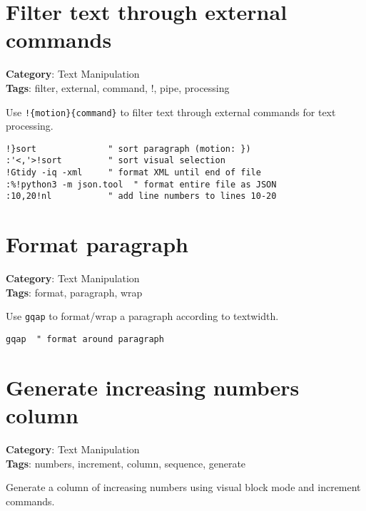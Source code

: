 {{{{{{{{{{{{{\section{Filter text through external commands}

\textbf{Category}: Text Manipulation\\ \textbf{Tags}: filter, external, command, !, pipe, processing
\vspace{0.5cm}

Use {\footnotesize \Verb§!{motion}{command}§} to filter text through external commands for text processing.

\begin{Exa*}{}
\begin{Verbatim}[fontsize=\footnotesize, breaklines, breakanywhere]
!}sort              " sort paragraph (motion: })
:'<,'>!sort         " sort visual selection
!Gtidy -iq -xml     " format XML until end of file
:%!python3 -m json.tool  " format entire file as JSON
:10,20!nl           " add line numbers to lines 10-20
\end{Verbatim}
\end{Exa*}

\section{Format paragraph}

\textbf{Category}: Text Manipulation\\ \textbf{Tags}: format, paragraph, wrap
\vspace{0.5cm}

Use {\footnotesize \Verb§gqap§} to format/wrap a paragraph according to textwidth.

\begin{Exa*}{}
\begin{Verbatim}[fontsize=\footnotesize, breaklines, breakanywhere]
gqap  " format around paragraph
\end{Verbatim}
\end{Exa*}

\section{Generate increasing numbers column}

\textbf{Category}: Text Manipulation\\ \textbf{Tags}: numbers, increment, column, sequence, generate
\vspace{0.5cm}

Generate a column of increasing numbers using visual block mode and increment commands.

}}}}}}}}}}}}}
